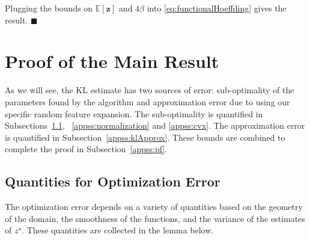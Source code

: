 \documentclass[twoside]{article}
\theoremstyle{definition}
\newcommand{\E}{\mathbb{E}}
\newcommand{\1}[1]{\scalebox{1.25}{$\mathds{1}$}\left[#1\right]}
\begin{document}
Plugging the bounds on $\E[\bm{z}]$ and $4\beta$ into \eqref{eq:functionalHoeffding} gives the result.
\hfill$\blacksquare$



\section{Proof of the  Main Result}
\label{app:proof}

As we will see, the KL estimate has two sources of error: sub-optimality of the parameters found by the algorithm and approximation error due to using our specific random feature expansion. The sub-optimality is quantified in Subsections~\ref{appss:constPf}, ~\ref{appss:normalization} and \ref{appss:cvx}. The approximation error is quantified in Subsection~\ref{appss:klApprox}. These bounds are combined to complete the proof in Subsection~\ref{appss:pf}.

\subsection{Quantities for Optimization Error}
\label{appss:constPf}

The optimization error depends on a variety of quantities based on the geometry of  the domain, the smoothness of the functions, and the variance of the estimates of $z^\star$. These quantities are collected in the lemma below. 
\end{document}
